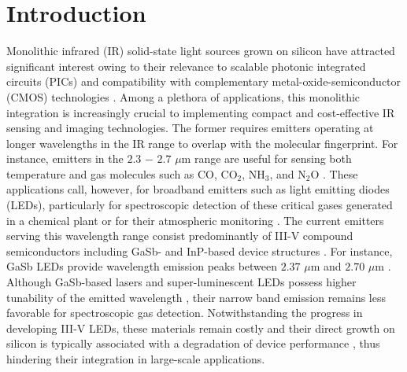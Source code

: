 \section{Introduction}

Monolithic infrared (IR) solid-state light sources grown on silicon have attracted significant interest owing to their relevance to scalable photonic integrated circuits (PICs) and compatibility with complementary metal-oxide-semiconductor (CMOS) technologies \cite{powell2022integrated,kim2023short,hu2017silicon}. Among a plethora of applications, this monolithic integration is increasingly crucial to implementing compact and cost-effective IR sensing and imaging technologies. The former requires emitters operating at longer wavelengths in the IR range to overlap with the molecular fingerprint. For instance, emitters in the  $2.3$ $-$ $2.7$ $\mu$m range are useful for sensing both temperature and gas molecules such as  CO, CO$_{2}$, NH$_{3}$, and N$_{2}$O \cite{zia2019high,mathews2021high,stritzke2015tdlas,ji2022mid12,lamoureux2021situ,bader2020progress,ryczko2021interband,olafsen2020optically,dolores2017waveguide,aziz2017multispectral,shterengas2016cascade,li2018dual}.   
These applications call, however,  for broadband emitters such as light emitting diodes (LEDs),  particularly for spectroscopic detection of these critical gases generated in a chemical plant or for their atmospheric monitoring \cite{mikhailova2007optoelectronic,stoyanov2012middle}.
The current emitters serving this wavelength range consist predominantly of III-V compound semiconductors including GaSb- and InP-based device structures \cite{dai2022growth,alexandrov2002portable,sprengel2015continuous,meyer2020interband}. For instance, GaSb LEDs provide wavelength emission peaks between $2.37$ $\mu$m and $2.70$ $\mu$m \cite{danilova2005light,tournie2019mid}. Although GaSb-based lasers and super-luminescent LEDs possess higher tunability of the emitted wavelength \cite{coldren2000monolithic,lee2007widely,sprengel2015continuous,karioja2017multi}, their narrow band emission remains less favorable for spectroscopic gas detection. Notwithstanding the progress in developing III-V LEDs, these materials remain costly and their direct growth on silicon is typically associated with a degradation of device performance \cite{Moutanabbir2010}, thus hindering their integration in large-scale applications. 


